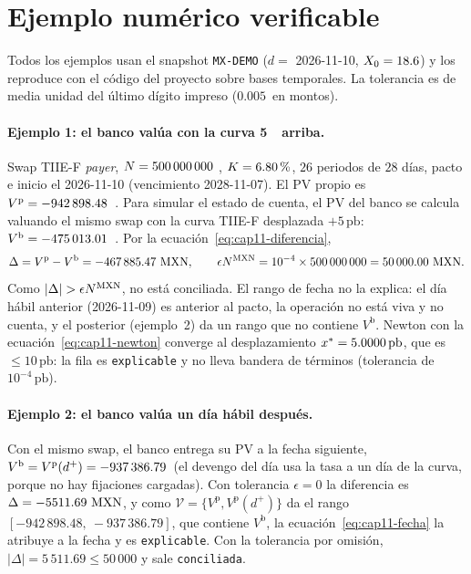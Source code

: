 \section{Ejemplo numérico verificable}\label{sec:cap11-ejemplo}

Todos los ejemplos usan el snapshot \texttt{MX-DEMO} ($d = $ 2026-11-10, $\Spot = 18.6$) y los reproduce  con el código del proyecto sobre bases temporales. La tolerancia es de media unidad del último dígito impreso ($0.005$~\MXN en montos).

\paragraph{Ejemplo 1: el banco valúa con la curva 5~\pb\ arriba.} Swap TIIE-F \emph{payer}, $\Nom = 500\,000\,000$ \MXN, $\K = 6.80\,\%$, $26$ periodos de $28$ días, pacto e inicio el 2026-11-10 (vencimiento 2028-11-07). El PV propio es $V^{\mathrm{p}} = \verif{cap11-pv-propio}{-942898.48}$~\MXN. Para simular el estado de cuenta, el PV del banco se calcula valuando el mismo swap con la curva TIIE-F desplazada $+5\,\mathrm{pb}$: $V^{\mathrm{b}} = \verif{cap11-pv-banco}{-475013.01}$~\MXN. Por la ecuación~\eqref{eq:cap11-diferencia},
\[
  \Delta = V^{\mathrm{p}} - V^{\mathrm{b}} = \verif{cap11-dif-curva}{-467885.47}~\MXN,
  \qquad
  \epsilon N^{\MXN} = 10^{-4} \times 500\,000\,000 = \verif{cap11-tolerancia-abs}{50000.00}~\MXN.
\]
Como $|\Delta| > \epsilon N^{\MXN}$, no está conciliada. El rango de fecha no la explica: el día hábil anterior (2026-11-09) es anterior al pacto, la operación no está viva y no cuenta, y el posterior (ejemplo~2) da un rango que no contiene $V^{\mathrm{b}}$. Newton con la ecuación~\eqref{eq:cap11-newton} converge al desplazamiento $x^{*} = \verif{cap11-bp-implicito}{5.0000}\,\mathrm{pb}$, que es $\le 10\,\mathrm{pb}$: la fila es \texttt{explicable} y no lleva bandera de términos (tolerancia de $10^{-4}\,\mathrm{pb}$).

\paragraph{Ejemplo 2: el banco valúa un día hábil después.} Con el mismo swap, el banco entrega su PV a la fecha siguiente, $V^{\mathrm{b}} = V^{\mathrm{p}}(d^{+}) = \verif{cap11-pv-dia-siguiente}{-937386.79}$~\MXN (el devengo del día usa la tasa a un día de la curva, porque no hay fijaciones cargadas). Con tolerancia $\epsilon = 0$ la diferencia es $\Delta = \verif{cap11-dif-fecha}{-5511.69}~\MXN$, y como $\mathcal{V} = \{V^{\mathrm{p}}, V^{\mathrm{p}}(d^{+})\}$ da el rango $[-942\,898.48,\ -937\,386.79]$, que contiene $V^{\mathrm{b}}$, la ecuación~\eqref{eq:cap11-fecha} la atribuye a la fecha y es \texttt{explicable}. Con la tolerancia por omisión, $|\Delta| = 5\,511.69 \le 50\,000$ y sale \texttt{conciliada}.

